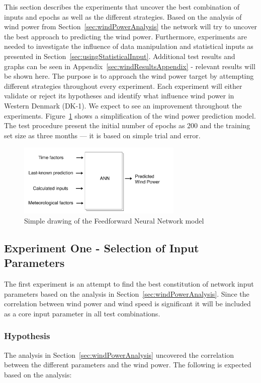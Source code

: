 This section describes the experiments that uncover the best combination of inputs and epochs as well as the different strategies. Based on the analysis of wind power from Section~\ref{sec:windPowerAnalysis} the network will try to uncover the best approach to predicting the wind power. Furthermore, experiments are needed to investigate the influence of data manipulation and statistical inputs as presented in Section~\ref{sec:usingStatisticalInput}. Additional test results and graphs can be seen in Appendix~\ref{sec:windResultsAppendix} - relevant results will be shown here. The purpose is to approach the wind power target by attempting different strategies throughout every experiment. Each experiment will either validate or reject its hypotheses and identify what influence wind power in Western Denmark (DK-1). We expect to see an improvement throughout the experiments. Figure~\ref{fig:WindPowerNetworkModel} shows a simplification of the wind power prediction model. The test procedure present the initial number of epochs as 200 and the training set size as three months --- it is based on simple trial and error.  

\begin{figure}[ht!]
\centering
\includegraphics[width=0.70\textwidth]{billeder/WindPowerNetworkModel.png}
\caption{Simple drawing of the Feedforward Neural Network model}
\label{fig:WindPowerNetworkModel}
\end{figure} 

\subsection{Experiment One - Selection of Input Parameters}
\label{sec:windPowerExperimentOne}
The first experiment is an attempt to find the best constitution of network input parameters based on the analysis in Section~\ref{sec:windPowerAnalysis}. Since the correlation between wind power and wind speed is significant it will be included as a core input parameter in all test combinations.

\subsubsection{Hypothesis}
The analysis in Section~\ref{sec:windPowerAnalysis} uncovered the correlation between the different parameters and the wind power. The following is expected based on the analysis:

